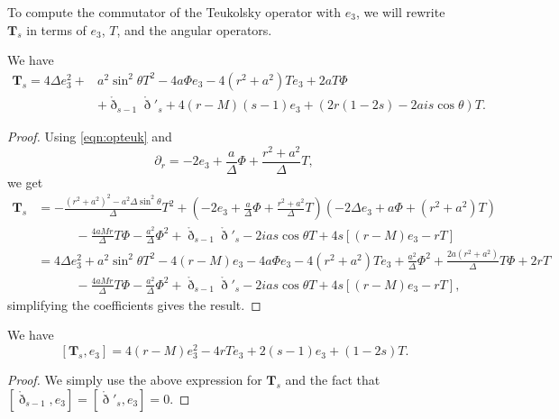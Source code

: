 \documentclass[reqno]{amsart}
\numberwithin{equation}{section}
\newcommand{\drond}{\mathring{\eth}}
\newcommand{\teuk}{\mathbf{T}}
\theoremstyle{plain}
\theoremstyle{definition}
\theoremstyle{remark}
\numberwithin{equation}{section}
\begin{document}
To compute the commutator of the Teukolsky operator with $e_3$, we will rewrite $\teuk_s$ in terms of $e_3$, $T$, and the angular operators.
\begin{prop}\label{prop:teukavece3}
    We have 
\begin{align*}
    \mathbf{T}_s=4\Delta e_3^2+&a^2\sin^2\theta T^2-4a\Phi e_3-4(r^2+a^2)Te_3+2aT\Phi \\
    &+\drond_{s-1}\drond'_{s}+4(r-M)(s-1)e_3+(2r(1-2s)-2ais\cos\theta)T.
\end{align*}
\end{prop}
\begin{proof}
    
Using \eqref{eqn:opteuk} and
$$\partial_r=-2e_3+\frac{a}{\Delta}\Phi+\frac{r^2+a^2}{\Delta}T,$$
we get 
\begin{align*}
    \teuk_s&=-\frac{(r^2+a^2)^2-a^2\Delta\sin^2\theta}{\Delta}T^2+\left(-2e_3+\frac{a}{\Delta}\Phi+\frac{r^2+a^2}{\Delta}T\right)(-2\Delta e_3+a\Phi+(r^2+a^2)T)\\
    &\quad\quad\quad-\frac{4aMr}{\Delta}T\Phi-\frac{a^2}{\Delta}\Phi^2+\drond_{s-1}\drond'_s-2ias\cos\theta T+4s[(r-M)e_3-rT]\\
    &=4\Delta e_3^2+a^2\sin^2\theta T^2-4(r-M)e_3-4a\Phi e_3-4(r^2+a^2)Te_3+\frac{a^2}{\Delta}\Phi^2+\frac{2a(r^2+a^2)}{\Delta}T\Phi+2r T\\
    &\quad\quad\quad-\frac{4aMr}{\Delta}T\Phi-\frac{a^2}{\Delta}\Phi^2+\drond_{s-1}\drond'_s-2ias\cos\theta T+4s[(r-M)e_3-rT],
\end{align*}
simplifying the coefficients gives the result.
\end{proof}
\begin{prop}\label{prop:comme3}
    We have 
    $$[\teuk_s,e_3]=4(r-M)e_3^2-4rTe_3+2(s-1)e_3+(1-2s)T.$$
\end{prop}
\begin{proof}
    We simply use the above expression for $\teuk_s$ and the fact that $[\drond_{s-1},e_3]=[\drond'_s,e_3]=0$.
\end{proof}
\end{document}

